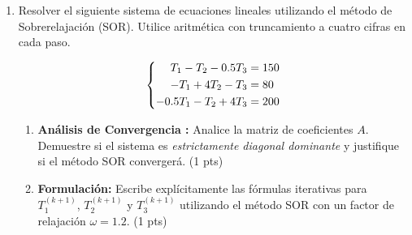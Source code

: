 \documentclass[12pt, letterpaper]{article}
\begin{document}
\begin{enumerate}
\textbf{Totales del Panel de Control.} El monitoreo del sistema reporta:
\begin{enumerate}
    \item \textbf{Conexiones totales:} 35 usuarios.
    \item \textbf{Carga de CPU:} 80 unidades de procesamiento.
    \item \textbf{Tráfico de Red:} 375 Mbps de ancho de banda total.
\end{enumerate}

El Problema a resolver es determinar la cantidad de usuarios en cada calidad ($x_1$, $x_2$, $x_3$) utilizando los datos proporcionados.

\begin{enumerate}
    \item Plantea el sistema $Ax = b$ ordenando las ecuaciones de la más simple (conteo de usuarios) a la más compleja (ancho de banda). (2 pts)
    \item Encuentra la factorización $A = LU$ (donde $L$ es triangular inferior con 1s en la diagonal y $U$ es triangular superior). (3 pts)
    \item Resuelve el sistema mediante los pasos de sustitución: $Ly = b$ y $Ux = y$. (2 pts)
\end{enumerate}

\item Resolver el siguiente sistema de ecuaciones lineales utilizando el método de Sobrerelajación (SOR). Utilice aritmética con truncamiento a cuatro cifras en cada paso.

\begin{equation*} \label{eq:system}
\left\{
\begin{alignedat}
    4T_1 - T_2 - 0.5T_3 & = 150 \\
    -T_1 + 4T_2 - T_3 & = 80 \\
    -0.5T_1 - T_2 + 4T_3 & = 200
\end{alignedat}
\right.
\end{equation*}

\begin{enumerate}
    \item \textbf{Análisis de Convergencia :} Analice la matriz de coeficientes $A$. Demuestre si el sistema es \textit{estrictamente diagonal dominante} y justifique si el método SOR convergerá. (1 pts)
    
    \item \textbf{Formulación:} Escribe explícitamente las fórmulas iterativas para $T_1^{(k+1)}$, $T_2^{(k+1)}$ y $T_3^{(k+1)}$ utilizando el método SOR con un factor de relajación $\omega = 1.2$. (1 pts)
    

\end{enumerate}
\end{enumerate}
\end{document}
